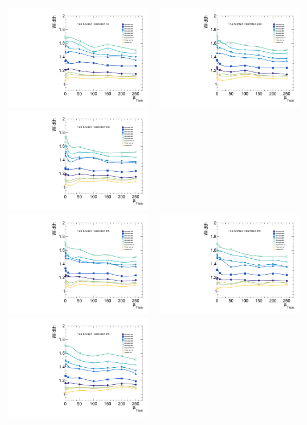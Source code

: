 \begin{figure}[!ht]
  \centering
  \includegraphics[width=0.33\textwidth]{Fig/BiasStudy/Linearity/ZJpsiG_Cat2/pull_width_linearity_TrueFunc0}~
  \includegraphics[width=0.33\textwidth]{Fig/BiasStudy/Linearity/ZJpsiG_Cat2/pull_width_linearity_TrueFunc1}~
  \includegraphics[width=0.33\textwidth]{Fig/BiasStudy/Linearity/ZJpsiG_Cat2/pull_width_linearity_TrueFunc2}\\
  \includegraphics[width=0.33\textwidth]{Fig/BiasStudy/Linearity/ZJpsiG_Cat2/pull_width_linearity_TrueFunc3}~
  \includegraphics[width=0.33\textwidth]{Fig/BiasStudy/Linearity/ZJpsiG_Cat2/pull_width_linearity_TrueFunc4}~
  \includegraphics[width=0.33\textwidth]{Fig/BiasStudy/Linearity/ZJpsiG_Cat2/pull_width_linearity_TrueFunc5}\\

\end{figure}
